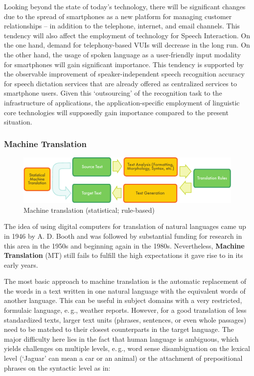 \documentclass[]{../../metanetpaper}
\begin{document}
\begin{multicols}{2}
Looking beyond the state of today’s technology, there will be significant changes due to the spread of smartphones as a new platform for managing customer relationships – in addition to the telephone, internet, and email channels. This tendency will also affect the employment of technology for Speech Interaction. On the one hand, demand for telephony-based VUIs will decrease in the long run. On the other hand, the usage of spoken language as a user-friendly input modality for smartphones will gain significant importance. This tendency is supported by the observable improvement of speaker-independent speech recognition accuracy for speech dictation services that are already offered as centralized services to smartphone users. Given this ‘outsourcing’ of the recognition task to the infrastructure of applications, the application-specific employment of linguistic core technologies will supposedly gain importance compared to the present situation.

\subsubsection{Machine Translation}

\begin{figure}[htb]
  \center
  \includegraphics[width=\textwidth]{../_media/english/machine_translation}
  \caption{Machine translation (statistical; rule-based)}
  \label{fig:mtarch_en}
\end{figure}

The idea of using digital computers for translation of natural languages came up in 1946 by A. D. Booth and was followed by substantial funding for research in this area in the 1950s and beginning again in the 1980s. Nevertheless, \textbf{Machine Translation} (MT) still fails to fulfill the high expectations it gave rise to in its early years.  


The most basic approach to machine translation is the automatic replacement of the words in a text written in one natural language with the equivalent words of another language. This can be useful in subject domains with a very restricted, formulaic language, e.\,g., weather reports. However, for a good translation of less standardized texts, larger text units (phrases, sentences, or even whole passages) need to be matched to their closest counterparts in the target language. The major difficulty here lies in the fact that human language is ambiguous, which yields challenges on multiple levels, e.\,g., word sense disambiguation on the lexical level (`Jaguar' can mean a car or an animal) or the attachment of prepositional phrases on the syntactic level as in:


\end{multicols}
\end{document}
